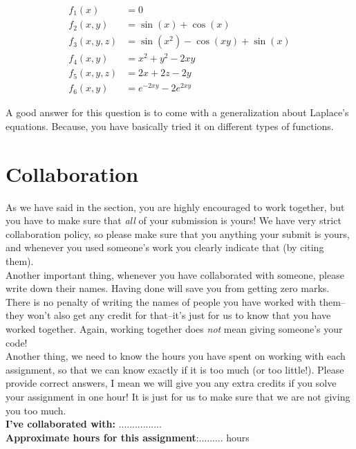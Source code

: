 \documentclass[paper=a4, fontsize=11pt]{scrartcl} %
\numberwithin{equation}{section} %
\numberwithin{figure}{section} %
\numberwithin{table}{section} %
\begin{document}
\begin{align}
f_1(x) &= 0\\
f_2(x, y) &= \sin(x) + \cos(x)\\
f_3(x, y, z) &= \sin(x^2) - \cos(xy) + \sin(x)\\
f_4(x, y) &= x^2 + y^2 - 2xy\\
f_5(x, y, z) &= 2x + 2z - 2y\\
f_6(x, y) &= e^{-2xy} - 2 e^{2xy}
\end{align}

A good answer for this question is to come with a generalization about Laplace's equations. Because, you have basically tried it on different types of functions.

\section{Collaboration}
As we have said in the section, you are highly encouraged to work together, but you have to make sure that \textit{all} of your submission is yours! We have very strict collaboration policy, so please make sure that you anything your submit is yours, and whenever you used someone's work you clearly indicate that (by citing them).\\
Another important thing, whenever you have collaborated with someone, please write down their names. Having done will save you from getting zero marks. There is no penalty of writing the names of people you have worked with them--they won't also get any credit for that--it's just for us to know that you have worked together. Again, working together does \textit{not} mean giving someone's your code!\\
Another thing, we need to know the hours you have spent on working with each assignment, so that we can know exactly if it is too much (or too little!). Please provide correct answers, I mean we will give you any extra credits if you solve your assignment in one hour! It is just for us to make sure that we are not giving you too much.
\\

\textbf{I've collaborated with:} ................\\
\textbf{Approximate hours for this assignment}:......... hours


 
\end{document}
